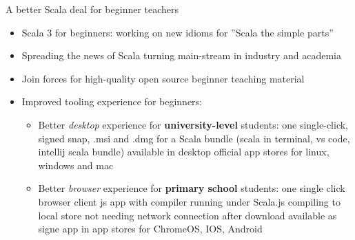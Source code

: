 \documentclass[aspectratio=169]{beamer}
\newcommand{\EndSlide}{\begin{frame}[plain]\endpage\end{frame}}
\newenvironment{Slide}[1]%
  {\begin{frame}[environment=Slide]{#1}}
  {\end{frame}}%
\begin{document}
\begin{Slide}{A better Scala deal for beginner teachers}
  \begin{itemize}
    \item Scala 3 for beginners: working on new idioms for ''Scala the simple parts''
    \item Spreading the news of Scala turning main-stream in industry and academia
    \item Join forces for high-quality open source beginner teaching material
    \item Improved tooling experience for beginners: 
    \begin{itemize}
      \item Better \textit{desktop} experience for \textbf{university-level} students: one single-click, signed snap, .msi and .dmg for a Scala bundle (scala in terminal, vs code, intellij scala bundle) available in desktop official app stores for linux, windows and mac
      \item Better \textit{browser} experience for \textbf{primary school} students: one single click browser client js app with compiler running under Scala.js compiling to local store not needing network connection after download available as signe app in app stores for ChromeOS, IOS, Android
    \end{itemize}
  \end{itemize}

\end{Slide}

\EndSlide
\end{document}
